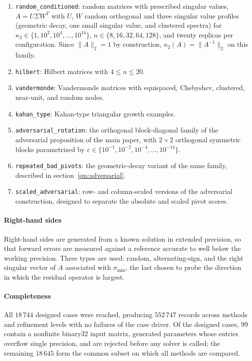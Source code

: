 \documentclass[supplement,review,onefignum,onetabnum]{siamart251216}
\begin{document}
\begin{enumerate}
\item \texttt{random\_conditioned}: random matrices with prescribed singular
values, $A = U\Sigma W^T$ with $U$, $W$ random orthogonal and three singular
value profiles (geometric decay, one small singular value, and clustered
spectra) for $\kappa_2 \in \{1,10^2,10^4,\dots,10^{14}\}$,
$n\in\{8,16,32,64,128\}$, and twenty replicas per configuration. Since
$\|A\|_2=1$ by construction, $\kappa_2(A)=\|A^{-1}\|_2$ on this family.

\item \texttt{hilbert}: Hilbert matrices with $4\le n\le 20$.

\item \texttt{vandermonde}: Vandermonde matrices with equispaced, Chebyshev,
clustered, near-unit, and random nodes.

\item \texttt{kahan\_type}: Kahan-type triangular growth examples.

\item \texttt{adversarial\_rotation}: the orthogonal block-diagonal family of
the adversarial proposition of the main paper, with $2\times2$ orthogonal symmetric blocks
parametrized by $\varepsilon\in\{10^{-1},10^{-2},10^{-4},\dots,10^{-14}\}$.

\item \texttt{repeated\_bad\_pivots}: the geometric-decay variant of the same
family, described in section~\ref{sm:adversarial}.

\item \texttt{scaled\_adversarial}: row- and column-scaled versions of the
adversarial construction, designed to separate the absolute and scaled pivot
scores.
\end{enumerate}

\paragraph{Right-hand sides}
Right-hand sides are generated from a known solution in extended precision, so
that forward errors are measured against a reference accurate to well below the
working precision. Three types are used: random, alternating-sign, and the
right singular vector of $A$ associated with $\sigma_{\min}$, the last chosen
to probe the direction in which the residual operator is largest.

\paragraph{Completeness}
All $18\,744$ designed cases were reached, producing $552\,747$
records across methods and refinement levels with no failures of the case driver. Of the designed
cases, $99$ contain a nonfinite binary32 input matrix, generated parameters
whose entries overflow single precision, and are rejected before any solver
is called; the remaining $18\,645$ form the common subset on which all methods
are compared.
\end{document}
